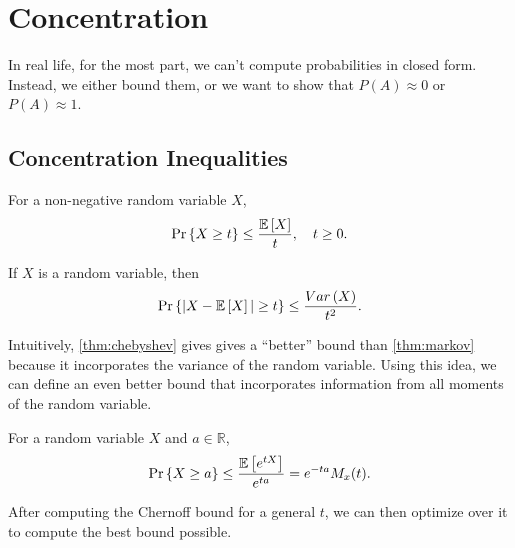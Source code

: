 \section{Concentration}
In real life, for the most part, we can't compute probabilities in closed form.
Instead, we either bound them, or we want to show that $P(A) \approx 0$ or $P(A) \approx 1$.
\subsection{Concentration Inequalities}
\begin{theorem}
  For a non-negative random variable $X$,
  \[
	\text{Pr}\left\{X \geq t\right\} \leq \frac{\mathbb{E}\left[X\right]}{t}, \quad t \geq 0.
  \]
  \label{thm:markov}
\end{theorem}
\begin{theorem}
  If $X$ is a random variable, then
  \[
	\text{Pr}\left\{|X - \mathbb{E}\left[X\right]| \geq t\right\} \leq \frac{Var\left(X\right)}{t^2}.
  \]
  \label{thm:chebyshev}
\end{theorem}
Intuitively, \cref{thm:chebyshev} gives gives a ``better'' bound than \cref{thm:markov} because it incorporates the variance of the random variable.
Using this idea, we can define an even better bound that incorporates information from all moments of the random variable.
\begin{definition}
	For a random variable $X$ and $a\in\mathbb{R}$,\[
		\text{Pr}\left\{X \geq a\right\} \leq \frac{\mathbb{E}\left[e^{tX}\right]}{e^{ta}} = e^{-ta}M_x(t).
	\]
	\label{defn:chernoff}
\end{definition}
After computing the Chernoff bound for a general $t$, we can then optimize over it to compute the best bound possible.
